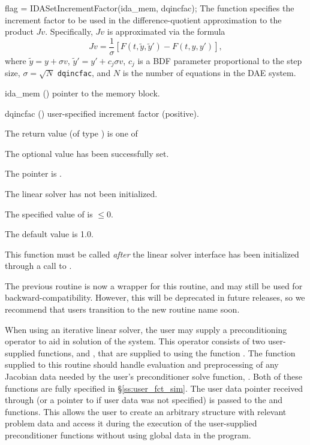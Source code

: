 {
{
  flag = IDASetIncrementFactor(ida\_mem, dqincfac);
}
{
  The function  specifies the increment
  factor to be used in the difference-quotient approximation to the
  product $Jv$.  Specifically, $Jv$ is approximated via the formula
  \[
    Jv = \frac{1}{\sigma}\left[F(t,\tilde{y},\tilde{y}') - F(t,y,y')\right],
  \]
  where $\tilde{y} = y + \sigma v$,  $\tilde{y}' = y' + c_j \sigma v$,
  $c_j$ is a BDF parameter proportional to the step size, $\sigma
  = \sqrt{N}$ \texttt{dqincfac}, and $N$ is the number of equations in
  the DAE system.
}
{
  \begin{args}[dqincfac]
  \item[ida\_mem] ()
    pointer to the {\ida} memory block.
  \item[dqincfac] ()
    user-specified increment factor (positive).
  \end{args}
}
{
  The return value  (of type ) is one of
  \begin{args}
  \item[\Id{IDALS\_SUCCESS}]
    The optional value has been successfully set.
  \item[\Id{IDALS\_MEM\_NULL}]
    The  pointer is .
  \item[\Id{IDALS\_LMEM\_NULL}]
    The {\idals} linear solver has not been initialized.
  \item[\Id{IDALS\_ILL\_INPUT}]
    The specified value of  is $\le 0$.
  \end{args}
}
{
  The default value is 1.0.

  This function must be called \emph{after} the {\idals} linear solver
  interface has been initialized through a call to
  .

  The previous routine  is now a wrapper for
  this routine, and may still be used for backward-compatibility.
  However, this will be deprecated in future releases, so we recommend
  that users transition to the new routine name soon.
}

When using an iterative linear solver, the user may supply a
preconditioning operator to aid in solution of the system.  This
operator consists of two user-supplied functions,  and
, that are supplied to {\ida} using the function
.  The  function supplied to
this routine should handle evaluation and preprocessing of any
Jacobian data needed by the user's preconditioner solve function,
.  Both of these functions are fully specified in
\S\ref{ss:user_fct_sim}.  The user data pointer received through
 (or a pointer to  if user data was not
specified) is passed to the  and  functions.
This allows the user to create an arbitrary structure with relevant
problem data and access it during the execution of the user-supplied
preconditioner functions without using global data in the program.

}
